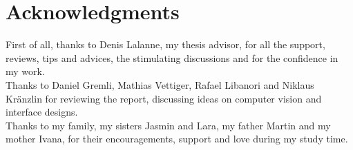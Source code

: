 \chapter*{Acknowledgments}
\doublespacing
First of all, thanks to Denis Lalanne, my thesis advisor, for all the support, reviews, tips and advices, the stimulating discussions and for the confidence in my work.\vspace*{12pt}\\
Thanks to Daniel Gremli, Mathias Vettiger, Rafael Libanori and Niklaus Kr\"{a}nzlin for reviewing the report, discussing ideas on computer vision and interface designs.\vspace*{12pt}\\
Thanks to my family, my sisters Jasmin and Lara, my father Martin and my mother Ivana, for their encouragements, support and love during my study time.

\singlespacing
